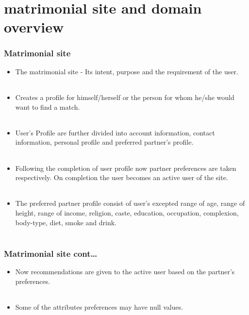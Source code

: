 \documentclass[10pt, compress]{beamer}
\begin{document}
\section{ matrimonial site and domain overview }

\begin{frame}[fragile]
  \frametitle{Matrimonial site}
  \begin{itemize}
 \item<1> The matrimonial site - Its intent, purpose  and the requirement of the user.\\~\
 \item<1> Creates a profile for himself/herself or the person for whom he/she would want to find a match.\\~\
 \item<1> User's Profile are further divided into \alert{account information, contact information, personal profile and preferred partner's profile}.\\~\
 \item<1> Following the completion of user profile now partner preferences are taken respectively. On completion the user becomes an \alert{active user} of the site.\\~\
 \item<1> The preferred partner profile consist of user's excepted range of age, range of height, range of income, religion, caste, education, occupation, complexion, body-type, diet, smoke and drink.\\~\
 
 
 \end{itemize}
 \end{frame}
 
 \begin{frame}[fragile]
  \frametitle{Matrimonial site cont\ldots}
  \begin{itemize}
  \item<1> Now recommendations are given to the active user based on the partner's preferences.\\~\
 
 
 \item<1> Some of the attributes preferences may have \alert{null values}.
 \end{itemize}
\end{frame}
\end{document}

